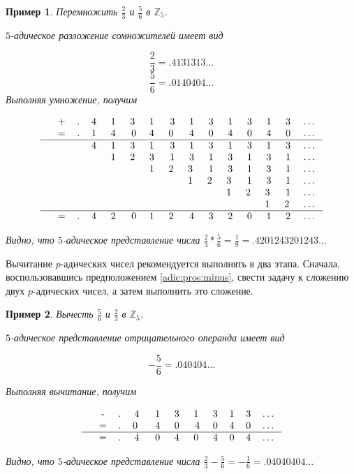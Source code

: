 \documentclass[master, och, diploma, times]{sty/SCWorks}
\theoremstyle{plain}
\newtheorem{exmp}{Пример}[section]
\theoremstyle{definition}
\begin{document}
\begin{exmp}
Перемножить $\frac{2}{3}$ и $\frac{5}{6}$ в $\mathbb{Z}_5$.

\noindent $5$-адическое разложение сомножителей имеет вид

$$
\frac{2}{3}=.4131313\dots
$$
$$
\frac{5}{6}=.0140404\dots
$$
Выполняя умножение, получим

$$
\begin{tabular}{ccccccccccccccccc}
& + & . & 4\; & 1\; & 3\; & 1\; & 3 & 1 & 3 & 1 & 3 & 1 & 3 & \dots \\
& = & . & 1\; & 4\; & 0 & 4\; & 0\; & 4 & 0 & 4 & 0 & 4 & 0 & \dots \\
\hline
& & & 4\; & 1\; & 3\; & 1\; & 3 & 1 & 3 & 1 & 3 & 1 & 3 & \dots \\
& & & & 1\; & 2\; & 3\; & 1 & 3 & 1 & 3 & 1 & 3 & 1 & \dots \\
& & & & & & 1\; & 2\; & 3\; & 1 & 3 & 1 & 3 & 1 & \dots \\
& & & & & & & & 1\; & 2\; & 3\; & 1 & 3 & 1 & \dots \\
& & & & & & & & & & 1\; & 2\; & 3\; & 1 &  \dots \\
& & & & & & & & & & & & 1\; & 2\; & \dots \\
\hline
& = & . & 4\; & 2\; & 0 & 1\; & 2\; & 4 & 3 & 2 & 0 & 1 & 2 & \dots \\
\end{tabular}
$$

\noindent Видно, что $5$-адическое представление числа $\frac{2}{3} * \frac{5}{6}=\frac{1}{9}=.4201243201243\dots$
\end{exmp}


Вычитание $p$-адических чисел рекомендуется выполнять в два этапа. Сначала, воспользовавшись предположением \ref{adic:pros:minus}, свести задачу к сложению двух $p$-адических чисел, а затем выполнить это сложение.

\begin{exmp}
Вычесть $\frac{5}{6}$ и $\frac{2}{3}$ в $\mathbb{Z}_5$.

\noindent $5$-адическое представление отрицательного операнда имеет вид

$$
-\frac{5}{6}=.040404\dots
$$

\noindent Выполняя вычитание, получим

$$
\begin{tabular}{cccccccccccc}
& - & . & 4\; & 1\; & 3\; & 1\; & 3 & 1 & 3 & \dots \\
& = & . & 0 \; & 4\; & 0\; & 4 & 0 & 4 & 0 & \dots \\
\hline
& = & . & 4\; & 0\; & 4\; & 0\; & 4 & 0 & 4 & \dots
\end{tabular}
$$

\noindent Видно, что $5$-адическое представление числа $\frac{2}{3} - \frac{5}{6}=-\frac{1}{6}=.04040404\dots$
\end{exmp}
\end{document}

